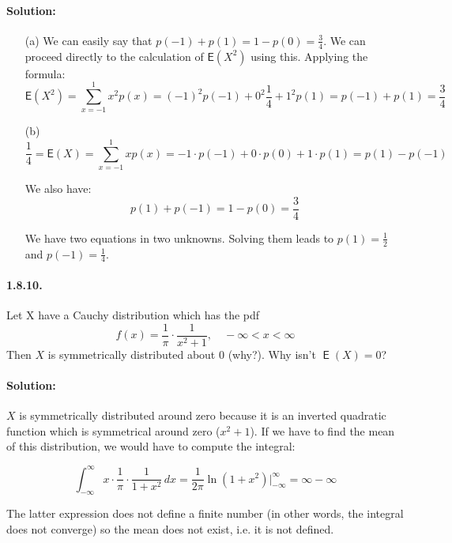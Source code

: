 \documentclass[12pt,a4paper]{article}
\DeclareMathOperator{\E}{\mathsf{E}}
\begin{document}
\paragraph{Solution:}
\begin{itemize}
	\item[(a)] We can easily say that $\displaystyle p(-1) + p(1) = 1 - p(0) = \frac{3}{4}$. We can proceed directly to the calculation of $\mathsf{E}(X^{2})$ using this. Applying the formula:
	\[
	\mathsf{E}(X^{2}) = \sum_{x=-1}^{1}x^{2}p(x) = (-1)^{2}p(-1) + 0^{2}\frac{1}{4} + 1^2p(1) =  p(-1) + p(1) = \frac{3}{4}
	\]
	
	\item[(b)]
	\[
	\frac{1}{4} = \mathsf{E}(X) = \sum_{x=-1}^{1}xp(x) = -1\cdot p(-1) + 0\cdot p(0) + 1\cdot p(1) = p(1) - p(-1)
	\]
	
	We also have:
	\[
	p(1) + p(-1) = 1 - p(0) = \frac{3}{4}
	\]
	
	We have two equations in two unknowns. Solving them leads to $\displaystyle p(1) = \frac{1}{2}$ and $\displaystyle p(-1) = \frac{1}{4}$.
\end{itemize}

\paragraph{1.8.10.} Let X have a Cauchy distribution which has the pdf
	\[
		f(x) = \dfrac{1}{\pi}\cdot \dfrac{1}{x^{2} + 1}, \quad -\infty < x < \infty
	\]
Then $X$ is symmetrically distributed about 0 (why?). Why isn't $ \E(X) = 0 $?

\paragraph{Solution:} $X$ is symmetrically distributed around zero because it is an inverted quadratic function which is symmetrical around zero ($x^2+1$). If we have to find the mean of this distribution, we would have to compute the integral: 

\[
	\int_{-\infty}^{\infty} x\cdot \frac{1}{\pi}\cdot \frac{1}{1+x^{2}}\,dx = \frac{1}{2\pi}\ln(1+x^{2})\Big|_{-\infty}^{\infty} = \infty - \infty
\]

The latter expression does not define a finite number (in other words, the integral does not converge) so the mean does not exist, i.e. it is not defined.
\end{document}
